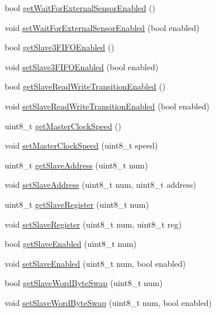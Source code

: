 \begin{DoxyCompactItemize}
bool \mbox{\hyperlink{class_m_p_u6050_a4e2ebda47b85b4c5463f041c790bf5c0}{get\+Wait\+For\+External\+Sensor\+Enabled}} ()
\item 
void \mbox{\hyperlink{class_m_p_u6050_a20dc4bdedbe1550580c28a6d090291be}{set\+Wait\+For\+External\+Sensor\+Enabled}} (bool enabled)
\item 
bool \mbox{\hyperlink{class_m_p_u6050_a9d75ec63e2320ecfb84a2b082397f900}{get\+Slave3\+F\+I\+F\+O\+Enabled}} ()
\item 
void \mbox{\hyperlink{class_m_p_u6050_a6ed713870c7f6d085ded91a45515a36c}{set\+Slave3\+F\+I\+F\+O\+Enabled}} (bool enabled)
\item 
bool \mbox{\hyperlink{class_m_p_u6050_a6b3c3aab80fcaa384303f9df2a59d7eb}{get\+Slave\+Read\+Write\+Transition\+Enabled}} ()
\item 
void \mbox{\hyperlink{class_m_p_u6050_a3413efbf2f4e8a27aa8768d9bc34d663}{set\+Slave\+Read\+Write\+Transition\+Enabled}} (bool enabled)
\item 
uint8\+\_\+t \mbox{\hyperlink{class_m_p_u6050_a4cda448ef5c5736bd14188947342d636}{get\+Master\+Clock\+Speed}} ()
\item 
void \mbox{\hyperlink{class_m_p_u6050_a8a4779ea709ff0633f9798369478400b}{set\+Master\+Clock\+Speed}} (uint8\+\_\+t speed)
\item 
uint8\+\_\+t \mbox{\hyperlink{class_m_p_u6050_af75b9f7ccac48515c7544238db0e6863}{get\+Slave\+Address}} (uint8\+\_\+t num)
\item 
void \mbox{\hyperlink{class_m_p_u6050_a3c07eb2c59fff3ddc7186319ee40ba6f}{set\+Slave\+Address}} (uint8\+\_\+t num, uint8\+\_\+t address)
\item 
uint8\+\_\+t \mbox{\hyperlink{class_m_p_u6050_ae7e9ead9645bcef326eb579c6ab5d5ff}{get\+Slave\+Register}} (uint8\+\_\+t num)
\item 
void \mbox{\hyperlink{class_m_p_u6050_a62851e982059a2462d52c210ad764a1c}{set\+Slave\+Register}} (uint8\+\_\+t num, uint8\+\_\+t reg)
\item 
bool \mbox{\hyperlink{class_m_p_u6050_a5f14bde83fe00b27dec6776fc44e89c2}{get\+Slave\+Enabled}} (uint8\+\_\+t num)
\item 
void \mbox{\hyperlink{class_m_p_u6050_afaffa021d7bb41f3a288827080602eee}{set\+Slave\+Enabled}} (uint8\+\_\+t num, bool enabled)
\item 
bool \mbox{\hyperlink{class_m_p_u6050_a18e8f3d053a68f0e5ecf497c87ecac8a}{get\+Slave\+Word\+Byte\+Swap}} (uint8\+\_\+t num)
\item 
void \mbox{\hyperlink{class_m_p_u6050_abeb1f83652066d7543fd3283af794364}{set\+Slave\+Word\+Byte\+Swap}} (uint8\+\_\+t num, bool enabled)

\end{DoxyCompactItemize}
